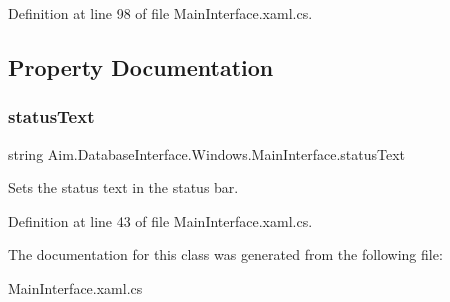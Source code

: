 Definition at line 98 of file Main\+Interface.\+xaml.\+cs.



\subsection{Property Documentation}
\mbox{\label{class_aim_1_1_database_interface_1_1_windows_1_1_main_interface_ab2ea5e6fe7f1a5f7691ae78883bc384e}} 
\subsubsection{\texorpdfstring{status\+Text}{statusText}}
{\footnotesize\ttfamily string Aim.\+Database\+Interface.\+Windows.\+Main\+Interface.\+status\+Text\hspace{0.3cm}{\ttfamily [set]}}



Sets the status text in the status bar. 



Definition at line 43 of file Main\+Interface.\+xaml.\+cs.



The documentation for this class was generated from the following file\+:\begin{DoxyCompactItemize}
\item 
Main\+Interface.\+xaml.\+cs\end{DoxyCompactItemize}
